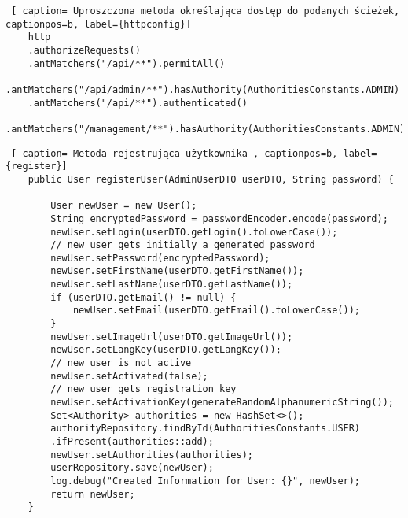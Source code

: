 \clearpage
\begin{lstlisting} [ caption= Uproszczona metoda określająca dostęp do podanych ścieżek, captionpos=b, label={httpconfig}]
	http
	.authorizeRequests()
	.antMatchers("/api/**").permitAll()
	.antMatchers("/api/admin/**").hasAuthority(AuthoritiesConstants.ADMIN)
	.antMatchers("/api/**").authenticated()
	.antMatchers("/management/**").hasAuthority(AuthoritiesConstants.ADMIN);
\end{lstlisting}


\begin{lstlisting} [ caption= Metoda rejestrująca użytkownika , captionpos=b, label={register}]
	public User registerUser(AdminUserDTO userDTO, String password) {
		
		User newUser = new User();
		String encryptedPassword = passwordEncoder.encode(password);
		newUser.setLogin(userDTO.getLogin().toLowerCase());
		// new user gets initially a generated password
		newUser.setPassword(encryptedPassword);
		newUser.setFirstName(userDTO.getFirstName());
		newUser.setLastName(userDTO.getLastName());
		if (userDTO.getEmail() != null) {
			newUser.setEmail(userDTO.getEmail().toLowerCase());
		}
		newUser.setImageUrl(userDTO.getImageUrl());
		newUser.setLangKey(userDTO.getLangKey());
		// new user is not active
		newUser.setActivated(false);
		// new user gets registration key
		newUser.setActivationKey(generateRandomAlphanumericString());
		Set<Authority> authorities = new HashSet<>();
		authorityRepository.findById(AuthoritiesConstants.USER)
		.ifPresent(authorities::add);
		newUser.setAuthorities(authorities);
		userRepository.save(newUser);
		log.debug("Created Information for User: {}", newUser);
		return newUser;
	}
\end{lstlisting}
\clearpage
